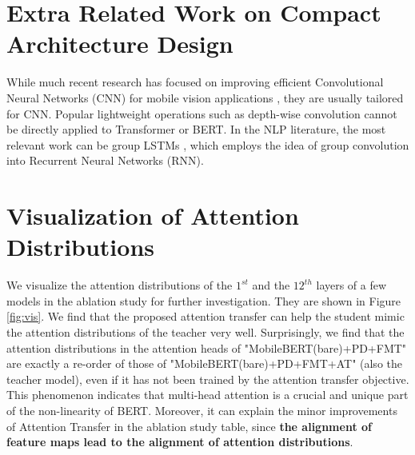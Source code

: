 \documentclass[11pt,a4paper]{article}
\begin{document}
\begin{figure*}[t]
	\centering
	\caption{The visualization of the attention distributions in some attention heads of the IB-BERT teacher and different MobileBERT models.}
	\label{fig:vis}
\end{figure*}

\section{Extra Related Work on Compact Architecture Design}
While much recent research has focused on improving efficient Convolutional Neural Networks (CNN) for mobile vision applications
\citep{iandola2016squeezenet,howard2017mobilenets,zhang2017interleaved,zhang2018shufflenet,sandler2018mobilenetv2,tan2019mnasnet,howard2019searching}, they are usually tailored for CNN.
Popular lightweight operations such as depth-wise convolution \citep{howard2017mobilenets} cannot be directly applied to Transformer or BERT. In the NLP literature, the most relevant work  can be group LSTMs \citep{kuchaiev2017factorization,gao2018efficient}, which employs the idea of group convolution \citep{zhang2017interleaved,zhang2018shufflenet} into Recurrent Neural Networks (RNN).




\section{Visualization of Attention Distributions}

We visualize the attention distributions of the $1^{st}$ and the $12^{th}$ layers of a few models in the ablation study for further investigation. They are shown in Figure \ref{fig:vis}. We find that the proposed attention transfer can help the student mimic the attention distributions of the teacher very well. Surprisingly, we find that the attention distributions in the attention heads of "MobileBERT(bare)+PD+FMT" are exactly a re-order of those of "MobileBERT(bare)+PD+FMT+AT" (also the teacher model), even if it has not been trained by the attention transfer objective. This phenomenon indicates that multi-head attention is a crucial and unique part of the non-linearity of BERT. Moreover, it can explain the minor improvements of Attention Transfer in the ablation study table, since \textbf{the alignment of feature maps lead to the alignment of attention distributions}.
\end{document}
